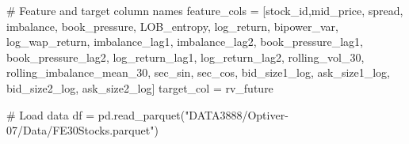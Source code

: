 \documentclass[
  letterpaper,
  DIV=11,
  numbers=noendperiod]{scrartcl}
\newenvironment{Shaded}{\begin{snugshade}}{\end{snugshade}}
\newcommand{\CommentTok}[1]{\textcolor[rgb]{0.37,0.37,0.37}{#1}}
\newcommand{\NormalTok}[1]{\textcolor[rgb]{0.00,0.23,0.31}{#1}}
\newcommand{\OperatorTok}[1]{\textcolor[rgb]{0.37,0.37,0.37}{#1}}
\newcommand{\StringTok}[1]{\textcolor[rgb]{0.13,0.47,0.30}{#1}}
\begin{document}
\begin{Shaded}
\begin{Highlighting}[]
\CommentTok{\# Feature and target column names}
\NormalTok{feature\_cols }\OperatorTok{=}\NormalTok{ [}\StringTok{\textquotesingle{}stock\_id\textquotesingle{}}\NormalTok{,}\StringTok{\textquotesingle{}mid\_price\textquotesingle{}}\NormalTok{, }\StringTok{\textquotesingle{}spread\textquotesingle{}}\NormalTok{, }\StringTok{\textquotesingle{}imbalance\textquotesingle{}}\NormalTok{,}
       \StringTok{\textquotesingle{}book\_pressure\textquotesingle{}}\NormalTok{, }\StringTok{\textquotesingle{}LOB\_entropy\textquotesingle{}}\NormalTok{, }\StringTok{\textquotesingle{}log\_return\textquotesingle{}}\NormalTok{, }\StringTok{\textquotesingle{}bipower\_var\textquotesingle{}}\NormalTok{,}
       \StringTok{\textquotesingle{}log\_wap\_return\textquotesingle{}}\NormalTok{, }\StringTok{\textquotesingle{}imbalance\_lag1\textquotesingle{}}\NormalTok{, }\StringTok{\textquotesingle{}imbalance\_lag2\textquotesingle{}}\NormalTok{,}
       \StringTok{\textquotesingle{}book\_pressure\_lag1\textquotesingle{}}\NormalTok{, }\StringTok{\textquotesingle{}book\_pressure\_lag2\textquotesingle{}}\NormalTok{, }\StringTok{\textquotesingle{}log\_return\_lag1\textquotesingle{}}\NormalTok{,}
       \StringTok{\textquotesingle{}log\_return\_lag2\textquotesingle{}}\NormalTok{, }\StringTok{\textquotesingle{}rolling\_vol\_30\textquotesingle{}}\NormalTok{, }\StringTok{\textquotesingle{}rolling\_imbalance\_mean\_30\textquotesingle{}}\NormalTok{,}
       \StringTok{\textquotesingle{}sec\_sin\textquotesingle{}}\NormalTok{, }\StringTok{\textquotesingle{}sec\_cos\textquotesingle{}}\NormalTok{, }\StringTok{\textquotesingle{}bid\_size1\_log\textquotesingle{}}\NormalTok{, }\StringTok{\textquotesingle{}ask\_size1\_log\textquotesingle{}}\NormalTok{, }\StringTok{\textquotesingle{}bid\_size2\_log\textquotesingle{}}\NormalTok{,}
       \StringTok{\textquotesingle{}ask\_size2\_log\textquotesingle{}}\NormalTok{]}
\NormalTok{target\_col }\OperatorTok{=} \StringTok{\textquotesingle{}rv\_future\textquotesingle{}}
\end{Highlighting}
\end{Shaded}

\begin{Shaded}
\begin{Highlighting}[]
\CommentTok{\# Load data}
\NormalTok{df }\OperatorTok{=}\NormalTok{ pd.read\_parquet(}\StringTok{"DATA3888/Optiver{-}07/Data/FE30Stocks.parquet"}\NormalTok{)}
\end{Highlighting}
\end{Shaded}
\end{document}
